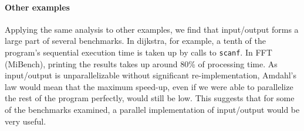 \paragraph{Other examples}

Applying the same analysis to other examples, we find that input/output forms a large part of several benchmarks.
In \textsf{dijkstra}, for example, a tenth of the program's sequential execution time is taken up by calls to \texttt{scanf}.
In \textsf{FFT} (MiBench), printing the results takes up around 80\% of processing time.
As input/output is unparallelizable without significant re-implementation, Amdahl's law would mean that the maximum speed-up, even if we were able to parallelize the rest of the program perfectly, would still be low.
This suggests that for some of the benchmarks examined, a parallel implementation of input/output would be very useful.










































